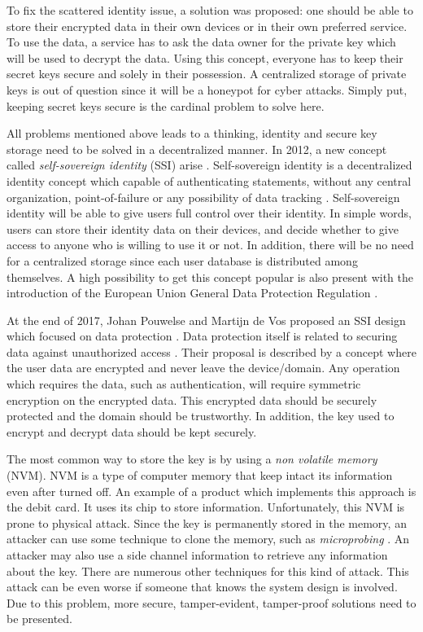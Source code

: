 To fix the scattered identity issue, a solution was proposed: one should be able to store their encrypted data in their own devices or in their own preferred service. To use the data, a service has to ask the data owner for the private key which will be used to decrypt the data. Using this concept, everyone has to keep their secret keys secure and solely in their possession.
A centralized storage of private keys is out of question since it will be a honeypot for cyber attacks. Simply put, keeping secret keys secure is the cardinal problem to solve here.


All problems mentioned above leads to a thinking, identity and secure key storage need to be solved in a decentralized manner.
In 2012, a new concept called \textit{self-sovereign identity} (SSI) arise \cite{moxytongue}.
Self-sovereign identity is a decentralized identity concept which capable of authenticating statements, without any central organization, point-of-failure or any possibility of data tracking \cite{pouwelse}. Self-sovereign identity will be able to give users full control over their identity. In simple words, users can store their identity data on their devices, and decide whether to give access to anyone who is willing to use it or not. In addition, there will be no need for a centralized storage since each user database is distributed among themselves. A high possibility to get this concept popular is also present with the introduction of the European Union General Data Protection Regulation \cite{eur-lex}.

At the end of 2017, Johan Pouwelse and Martijn de Vos proposed an SSI design which focused on data protection \cite{pouwelse}.
Data protection itself is related to securing data against unauthorized access \cite{data_protection_scheme}.
Their proposal is described by a concept where the user data are encrypted and never leave the device/domain. Any operation which requires the data, such as authentication, will require symmetric encryption on the encrypted data. This encrypted data should be securely protected and the domain should be trustworthy. In addition, the key used to encrypt and decrypt data should be kept securely.

The most common way to store the key is by using a \textit{non volatile memory} (NVM). NVM is a type of computer memory that keep intact its information even after turned off. An example of a product which implements this approach is the debit card. It uses its chip to store information. Unfortunately, this NVM is prone to physical attack. Since the key is permanently stored in the memory, an attacker can use some technique to clone the memory, such as \textit{microprobing} \cite{skorobogatov_2011}.  An attacker may also use a side channel information to retrieve any information about the key. There are numerous other techniques for this kind of attack. This attack can be even worse if someone that knows the system design is involved. Due to this problem, more secure, tamper-evident, tamper-proof solutions need to be presented.

